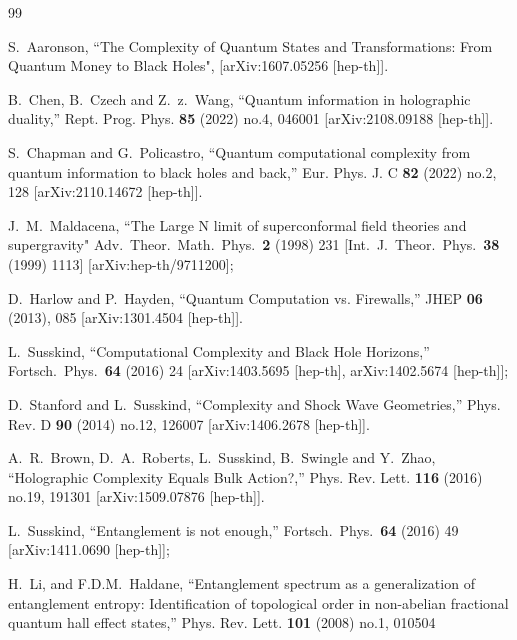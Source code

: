 \documentclass[aps,prl,twocolumn,showpacs,preprintnumbers,amsmath,amssymb]{revtex4-1}
\begin{document}
\begin{thebibliography}{99}

S.~Aaronson,
``The Complexity of Quantum States and Transformations: From Quantum Money to Black Holes",
  [arXiv:1607.05256 [hep-th]].

B.~Chen, B.~Czech and Z.~z.~Wang,
``Quantum information in holographic duality,''
Rept. Prog. Phys. \textbf{85} (2022) no.4, 046001
[arXiv:2108.09188 [hep-th]].

S.~Chapman and G.~Policastro,
``Quantum computational complexity from quantum information to black holes and back,''
Eur. Phys. J. C \textbf{82} (2022) no.2, 128
[arXiv:2110.14672 [hep-th]].

  J.~M.~Maldacena,
  ``The Large N limit of superconformal field theories and supergravity"
  Adv.\ Theor.\ Math.\ Phys.\  {\bf 2} (1998) 231
  [Int.\ J.\ Theor.\ Phys.\  {\bf 38} (1999) 1113]
  [arXiv:hep-th/9711200];

D.~Harlow and P.~Hayden,
``Quantum Computation vs. Firewalls,''
JHEP \textbf{06} (2013), 085
[arXiv:1301.4504 [hep-th]].

  L.~Susskind,
  ``Computational Complexity and Black Hole Horizons,''
  Fortsch.\ Phys.\  {\bf 64} (2016) 24
  [arXiv:1403.5695 [hep-th], arXiv:1402.5674 [hep-th]];
  
D.~Stanford and L.~Susskind,
``Complexity and Shock Wave Geometries,''
Phys. Rev. D \textbf{90} (2014) no.12, 126007
[arXiv:1406.2678 [hep-th]].

A.~R.~Brown, D.~A.~Roberts, L.~Susskind, B.~Swingle and Y.~Zhao,
``Holographic Complexity Equals Bulk Action?,''
Phys. Rev. Lett. \textbf{116} (2016) no.19, 191301
[arXiv:1509.07876 [hep-th]].
  
  L.~Susskind,
  ``Entanglement is not enough,''
  Fortsch.\ Phys.\  {\bf 64} (2016) 49
  [arXiv:1411.0690 [hep-th]];

H.~Li, and F.D.M.~Haldane,
``Entanglement spectrum as a generalization of entanglement entropy: Identification of topological order in non-abelian fractional quantum hall effect states,''
Phys. Rev. Lett. \textbf{101} (2008) no.1, 010504


\end{thebibliography}
\end{document}
